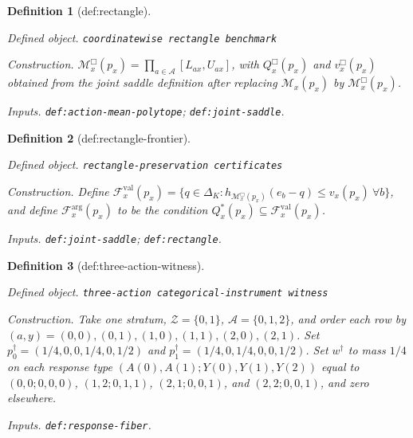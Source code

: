 \documentclass{article}
\newtheorem{definition}{Definition}
\begin{document}
\begin{definition}[def:rectangle]\label{def:rectangle}
\par\smallskip\noindent\emph{Defined object.} \texttt{coordinatewise rectangle benchmark}
\par\smallskip\noindent\emph{Construction.} \(\mathcal M_x^{\Box}(p_x)=\prod_{a\in\mathcal A}[L_{ax},U_{ax}]\), with \(Q_x^{\Box}(p_x)\) and \(v_x^{\Box}(p_x)\) obtained from the joint saddle definition after replacing \(\mathcal M_x(p_x)\) by \(\mathcal M_x^{\Box}(p_x)\).
\par\smallskip\noindent\emph{Inputs.} \texttt{def:\allowbreak{}action-\allowbreak{}mean-\allowbreak{}polytope}; \texttt{def:\allowbreak{}joint-\allowbreak{}saddle}.
\end{definition}

\begin{definition}[def:rectangle-frontier]\label{def:rectangle-frontier}
\par\smallskip\noindent\emph{Defined object.} \texttt{rectangle-\allowbreak{}preservation certificates}
\par\smallskip\noindent\emph{Construction.} Define \(\mathcal F_x^{\mathrm{val}}(p_x)=\{q\in\Delta_K:h_{\mathcal M_x^{\Box}(p_x)}(e_b-q)\leq v_x(p_x)\ \forall b\}\), and define \(\mathcal F_x^{\mathrm{arg}}(p_x)\) to be the condition \(Q_x^*(p_x)\subseteq\mathcal F_x^{\mathrm{val}}(p_x)\).
\par\smallskip\noindent\emph{Inputs.} \texttt{def:\allowbreak{}joint-\allowbreak{}saddle}; \texttt{def:\allowbreak{}rectangle}.
\end{definition}

\begin{definition}[def:three-action-witness]\label{def:three-action-witness}
\par\smallskip\noindent\emph{Defined object.} \texttt{three-\allowbreak{}action categorical-\allowbreak{}instrument witness}
\par\smallskip\noindent\emph{Construction.} Take one stratum, \(\mathcal Z=\{0,1\}\), \(\mathcal A=\{0,1,2\}\), and order each row by \((a,y)=(0,0),(0,1),(1,0),(1,1),(2,0),(2,1)\). Set \(p^\dagger_0=(1/4,0,0,1/4,0,1/2)\) and \(p^\dagger_1=(1/4,0,1/4,0,0,1/2)\). Set \(w^\dagger\) to mass \(1/4\) on each response type \((A(0),A(1);Y(0),Y(1),Y(2))\) equal to \((0,0;0,0,0)\), \((1,2;0,1,1)\), \((2,1;0,0,1)\), and \((2,2;0,0,1)\), and zero elsewhere.
\par\smallskip\noindent\emph{Inputs.} \texttt{def:\allowbreak{}response-\allowbreak{}fiber}.
\end{definition}
\end{document}
